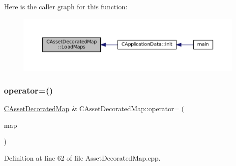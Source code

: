 Here is the caller graph for this function\+:
\nopagebreak
\begin{figure}[H]
\begin{center}
\leavevmode
\includegraphics[width=350pt]{classCAssetDecoratedMap_a03b043bddf72e2d97171b704f538f4d0_icgraph}
\end{center}
\end{figure}
\hypertarget{classCAssetDecoratedMap_a0330faaf18f597b5e2ebbbfcd8bf2819}{}\label{classCAssetDecoratedMap_a0330faaf18f597b5e2ebbbfcd8bf2819} 
\subsubsection{\texorpdfstring{operator=()}{operator=()}}
{\footnotesize\ttfamily \hyperlink{classCAssetDecoratedMap}{C\+Asset\+Decorated\+Map} \& C\+Asset\+Decorated\+Map\+::operator= (\begin{DoxyParamCaption}\item[{const \hyperlink{classCAssetDecoratedMap}{C\+Asset\+Decorated\+Map} \&}]{map }\end{DoxyParamCaption})}



Definition at line 62 of file Asset\+Decorated\+Map.\+cpp.


